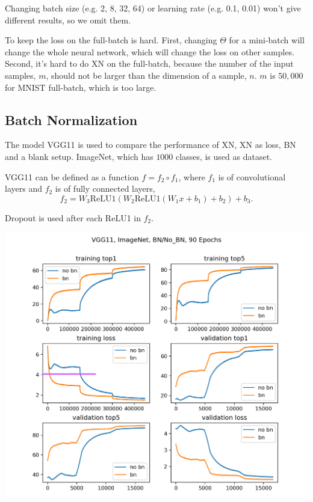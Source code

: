 Changing batch size (e.g. 2, 8, 32, 64) or learning rate (e.g. 0.1, 0.01) won't give different results, so we omit them.

To keep the loss on the full-batch is hard. First, changing $\Theta$ for a mini-batch will change the whole neural network, which will change the loss on other samples. Second, it's hard to do XN on the full-batch, because the number of the input samples, $m$, should not be larger than the dimension of a sample, $n$. $m$ is $50,000$ for MNIST full-batch, which is too large. 

\subsection{Batch Normalization}

The model VGG11 is used to compare the performance of XN, XN as loss, BN and a blank setup. ImageNet, which has $1000$ classes, is used as dataset.

VGG11 can be defined as a function $f=f_2\circ f_1$, where $f_1$ is of convolutional layers and $f_2$ is of fully connected layers,
\begin{equation}
f_2=W_3\text{ReLU1}(W_2\text{ReLU1}(W_1x+b_1)+b_2)+b_3.
\end{equation}

Dropout is used after each ReLU1 in $f_2$.

\begin{center}
	\includegraphics*[width=\textwidth]{./figures/BN_ImageNet.png}
\end{center}

